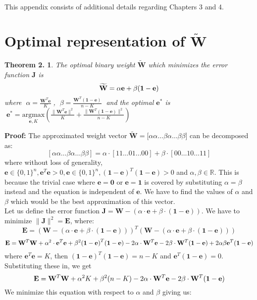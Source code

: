 
This appendix consists of additional details regarding Chapters 3 and 4.

\section{Optimal representation of $\widetilde{\mathbf{W}}$}
\newtheorem{name2}{Theorem 2.}
\begin{name2}
\label{approx}
The optimal binary weight $\widetilde{\mathbf{W}}$ which minimizes the error function $\mathbf{J}$ is
$$\widetilde{\mathbf{W}} = \alpha \mathbf{e} + \beta \mathbf{(1-e)} \\$$
where $\; \alpha =\frac{\mathbf{W}^{T}\mathbf{e}}{K} \;$, $\; \beta = \frac{\mathbf{W}^{T}\mathbf{(1-e)}}{n-K} \;$ and the optimal $\mathbf{e}^\ast$ is $\;  \mathbf{e}^\ast  = \underset{\mathbf{e},K}{\mathrm{argmax}} (\frac{ \parallel \mathbf{W}^T\mathbf{e} \parallel^{2}}{K} + \frac{\parallel \mathbf{W}^{T}\mathbf{(1-e)}\parallel^{2}}{n-K})$
\end{name2}

{\bf Proof:} The approximated weight vector $\widetilde{\mathbf{W}}=[\alpha \alpha \ldots \beta  \alpha  \ldots \beta \beta$] can be decomposed as:
$$[\alpha \alpha \ldots \beta  \alpha  \ldots \beta \beta] = \alpha \cdot [ 1 1 \ldots 0  1  \ldots 0 0 ] + \beta \cdot [ 0 0 \ldots 1  0  \ldots 1 1 ]$$ 
where without loss of generality, $\mathbf{e} \in \{0,1\}^n, \mathbf{e}^T\mathbf{e} >  0, \mathbf{e} \in \{0,1\}^n, (\mathbf{1-e})^T(\mathbf{1-e}) >  0$ and $\alpha,\beta \in \mathbb{R}$. This is because the trivial case where $\mathbf{e} = \mathbf{0}$ or $\mathbf{e} = \mathbf{1}$ is covered by substituting  $\alpha = \beta$ instead and the equation is independent of $\mathbf{e}$.
We have to find the values of $\alpha$ and $\beta$ which would be the best approximation of this vector. \\
Let us define the error function $\mathbf{J} = \mathbf{W} - (\alpha \cdot \mathbf{e} + \beta \cdot (\mathbf{1-e}))$.
We have to minimize $\parallel \mathbf{J} \parallel^2 = \mathbf{E}$, where:
\begin{dmath}
\mathbf{E} = (\mathbf{W} - (\alpha \cdot \mathbf{e} + \beta \cdot (\mathbf{1-e})))^T(\mathbf{W} - (\alpha \cdot \mathbf{e} + \beta \cdot (\mathbf{1-e}))) \end{dmath}
\begin{dmath}
\mathbf{E} = \mathbf{W}^{T}\mathbf{W} + \alpha^2 \cdot \mathbf{e}^T\mathbf{e} + \beta^2\mathbf{(1-e)}^T \mathbf{(1-e)} \\ - 2\alpha \cdot \mathbf{W}^T\mathbf{e} - 2\beta \cdot \mathbf{W}^T(\mathbf{1-e}) + 2\alpha \beta \mathbf{e}^{T}\mathbf{(1-e)}
\end{dmath}
where $\mathbf{e}^T\mathbf{e} = K$, then $(\mathbf{1-e})^T(\mathbf{1-e}) = n-K$ and $\mathbf{e}^{T}\mathbf{(1-e)} = 0$. Substituting these in, we get
\begin{equation}\mathbf{E} =  \mathbf{W}^{T}\mathbf{W} + \alpha^2 K + \beta^2 (n-K) -\\ 2\alpha \cdot \mathbf{W}^T\mathbf{e} - 2\beta \cdot \mathbf{W}^T(\mathbf{1-e}) \label{wformulation} 
\end{equation}
We minimize this equation with respect to $\alpha$ and $\beta$ giving us:

